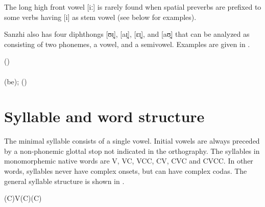 The long high front vowel [iː] is rarely found when spatial preverbs are prefixed to some verbs having [i] as stem vowel (see  below for examples).

Sanzhi also has four diphthongs [ʊɪ̯], [aɪ̯], [εɪ̯], and [aʊ̯] that can be analyzed as consisting of two phonemes, a vowel, and a semivowel. Examples are given in .
%
\begin{exe}
	\ex	\label{ex:diphthongs phon}
	\TabPositions{20em}
		  ()	\tab {} 	\\
		 		\tab  {} 	\\
		  (be);  ()	
\end{exe}





\section{Syllable and word structure}
\label{sec:Syllable and word structure}

The minimal syllable consists of a single vowel. Initial vowels are always preceded by a non-phonemic glottal stop not indicated in the orthography. The syllables in monomorphemic native words are V, VC, VCC, CV, CVC and CVCC. In other words, syllables never have complex onsets, but can have complex codas. The general syllable structure is shown in .
%
\begin{exe}
	\ex	(C)V(C)(C) \label{ex:syllable structure A phon}
\end{exe}

